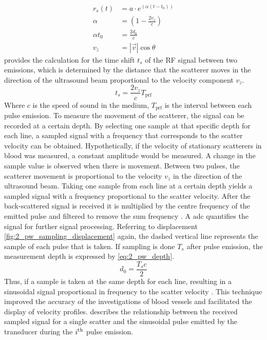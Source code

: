 \begin{subequations}
	\begin{align}
		r_{s}(t) &= a\cdot e^{\left( \alpha \left( t-t_{0} \right) \right)} \label{eq:2_pw_receive_signal_a} \\
		\alpha &= \left( 1- \frac{2v_{z}}{c} \right) \label{eq:2_pw_receive_signal_b} \\
		\alpha t_{0} &= \frac{2d_{0}}{c} \label{eq:2_pw_receive_signal_c} \\
		v_{z} &= \left| \vec{v} \right| \cos \theta \label{eq:2_pw_receive_signal_d}
	\end{align}
\end{subequations}
 provides the calculation for the time shift $t_{s}$ of the RF signal between two emissions, which is determined by the distance that the scatterer moves in the direction of the ultrasound beam proportional to the velocity component $v_{z}$.
\begin{equation} \label{eq:2_pw_ts_time_shift}
	t_{s} = \frac{2v_{z}}{c} T_{\mathrm{prf}}
\end{equation}
Where $c$ is the speed of sound in the medium, $T_{\mathrm{prf}}$ is the interval between each pulse emission. To measure the movement of the scatterer, the signal can be recorded at a certain depth. By selecting one sample at that specific depth for each line, a sampled signal with a frequency that corresponds to the scatter velocity can be obtained. Hypothetically, if the velocity of stationary scatterers in blood was measured, a constant amplitude would be measured. A change in the sample value is observed when there is movement. Between two pulses, the scatterer movement is proportional to the velocity $v_{z}$ in the direction of the ultrasound beam. Taking one sample from each line at a certain depth yields a sampled signal with a frequency proportional to the scatter velocity. After the back-scattered signal is received it is multiplied by the centre frequency of the emitted pulse and filtered to remove the sum frequency \cite{JensenUltrasoundBook}. A \gls{adc} quantifies the signal for further signal processing. Referring to displacement \cref{fig:2_pw_sampling_displacement} again, the dashed vertical line represents the sample of each pulse that is taken. If sampling is done $T_{s}$ after pulse emission, the measurement depth is expressed by \cref{eq:2_pw_depth}.
\begin{equation} \label{eq:2_pw_depth}
	d_{0} = \frac{T_{s}c}{2}
\end{equation}
Thus, if a sample is taken at the same depth for each line, resulting in a sinusoidal signal proportional in frequency to the scatter velocity \cite{Munk_Thesis}. This technique improved the accuracy of the investigations of blood vessels and facilitated the display of velocity profiles.  describes the relationship between the received sampled signal for a single scatter and the sinusoidal pulse emitted by the transducer during the $i\textsuperscript{th}$ pulse emission.
